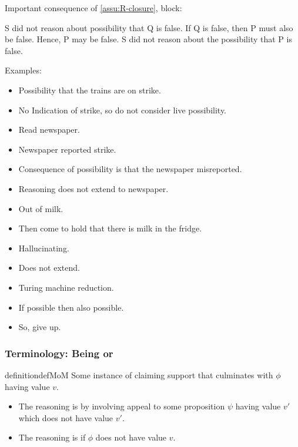 \begin{note}
  Important consequence of \autoref{assu:R-closure}, block:

  S did not reason about possibility that Q is false.
  If Q is false, then P must also be false.
  Hence, P may be false.
  S did not reason about the possibility that P is false.

  \begin{note}
  Examples:
  \begin{itemize}
  \item Possibility that the trains are on strike.
  \item No Indication of strike, so do not consider live possibility.
  \item Read newspaper.
  \item Newspaper reported strike.
  \item Consequence of possibility is that the newspaper misreported.
  \item Reasoning does not extend to newspaper.
  \end{itemize}

  \begin{itemize}
  \item Out of milk.
  \item Then come to hold that there is milk in the fridge.
  \item Hallucinating.
  \item Does not extend.
  \end{itemize}

  \begin{itemize}
  \item Turing machine reduction.
  \item If possible then also possible.
  \item So, give up.
  \end{itemize}
\end{note}
\end{note}

\subsubsection{Terminology: Being \mistaken{} or \misled{}}
\label{sec:presence}

\begin{note}
  \begin{restatable}{definition}{defMoM}\label{def:MoM}
    Some instance of claiming support that culminates with \(\phi\) having value \(v\).
    \begin{itemize}
      \item The reasoning is \emph{\mistaken{}} by involving appeal to some proposition \(\psi\) having value \(v'\) which does not have value \(v'\).
    \item The reasoning is \emph{\misled{}} if \(\phi\) does not have value \(v\).
    \end{itemize}
    \vspace{-\baselineskip}
  \end{restatable}
\end{note}

